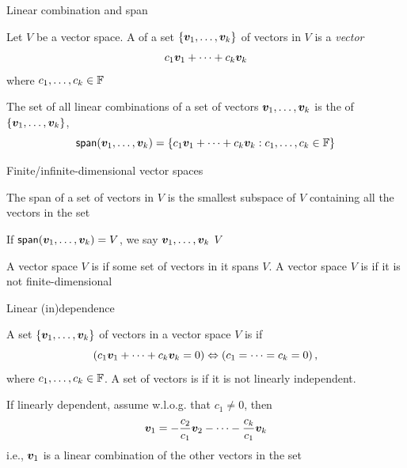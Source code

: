 \documentclass[aspectratio=169]{beamer}\usepackage[]{graphicx}\usepackage[]{xcolor}
\begin{document}
\begin{frame}{Linear combination and span}
	\begin{definition}
		Let $V$ be a vector space.
		A  of a set $\{\bm{v}_1,\ldots,\bm{v}_k\}$ of vectors in $V$ is a \emph{vector}
		\[
		c_1\bm{v}_1+\cdots+c_k\bm{v}_k
		\]
		where $c_1,\ldots,c_k\in\mathbb{F}$
	\end{definition}
	\vfill
	\begin{definition}[Span]
		The set of all linear combinations of a set of vectors $\bm{v}_1,\ldots,\bm{v}_k$ is the  of $\{\bm{v}_1,\ldots,\bm{v}_k\}$,
		\[
		\mathsf{span}(\bm{v}_1,\ldots,\bm{v}_k)=
		\left\{
		c_1\bm{v}_1+\cdots+c_k\bm{v}_k:c_1,\ldots,c_k\in\mathbb{F}
		\right\}
		\]
	\end{definition}
\end{frame}


\begin{frame}{Finite/infinite-dimensional vector spaces}
	\begin{theorem}
		The span of a set of vectors in $V$ is the smallest subspace of $V$ containing all the vectors in the set
	\end{theorem}
	\vfill
	\begin{definition}
		If $\mathsf{span}(\bm{v}_1,\ldots,\bm{v}_k)=V$, we say $\bm{v}_1,\ldots,\bm{v}_k$  $V$
	\end{definition}
	\vfill
	\begin{definition}
		A vector space $V$ is  if some set of vectors in it spans $V$.
		A vector space $V$ is  if it is not finite-dimensional
	\end{definition}
\end{frame}


\begin{frame}{Linear (in)dependence}
	\begin{definition}
		A set $\{\bm{v}_1,\ldots,\bm{v}_k\}$ of vectors in a vector space $V$ is  if
		\[
		\left(c_1\bm{v}_1+\cdots+c_k\bm{v}_k=0\right)
		\Leftrightarrow
		\left(c_1=\cdots=c_k=0\right),
		\]
		where $c_1,\ldots,c_k\in\mathbb{F}$. 
		A set of vectors is  if it is not linearly independent.
	\end{definition}
	\vfill
	If linearly dependent, assume w.l.o.g. that $c_1\neq 0$, then
	\[
	\bm{v}_1 = -\frac{c_2}{c_1}\bm{v}_2-\cdots-\frac{c_k}{c_1}\bm{v}_k
	\]
	i.e., $\bm{v}_1$ is a linear combination of the other vectors in the set
\end{frame}
\end{document}
